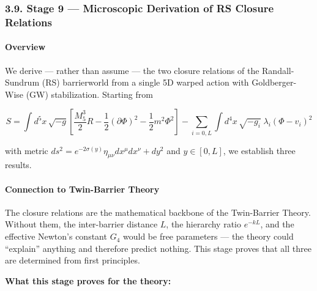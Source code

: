 \documentclass[
  11pt,
]{article}
\begin{document}
\hypertarget{stage-9-microscopic-derivation-of-rs-closure-relations}{%
\subsubsection{3.9. Stage 9 --- Microscopic Derivation of RS Closure
Relations}\label{stage-9-microscopic-derivation-of-rs-closure-relations}}

\hypertarget{overview-8}{%
\paragraph{Overview}\label{overview-8}}

We derive --- rather than assume --- the two closure relations of the
Randall-Sundrum (RS) barrierworld from a single 5D warped action with
Goldberger-Wise (GW) stabilization. Starting from

\[S = \int d^5x\,\sqrt{-g}\left[\frac{M_5^3}{2}R - \frac{1}{2}(\partial\Phi)^2 - \frac{1}{2}m^2\Phi^2\right] - \sum_{i=0,L}\int d^4x\,\sqrt{-g_i}\;\lambda_i(\Phi - v_i)^2 \tag{142}\]

with metric \(ds^2 = e^{-2\sigma(y)}\eta_{\mu\nu}dx^\mu dx^\nu + dy^2\)
and \(y \in [0,L]\), we establish three results.

\bigskip

\hypertarget{connection-to-twin-barrier-theory-8}{%
\paragraph{Connection to Twin-Barrier
Theory}\label{connection-to-twin-barrier-theory-8}}

The closure relations are the mathematical backbone of the Twin-Barrier
Theory. Without them, the inter-barrier distance \(L\), the hierarchy
ratio \(e^{-kL}\), and the effective Newton's constant \(G_4\) would be
free parameters --- the theory could ``explain'' anything and therefore
predict nothing. This stage proves that all three are determined from
first principles.

\textbf{What this stage proves for the theory:}
\end{document}
